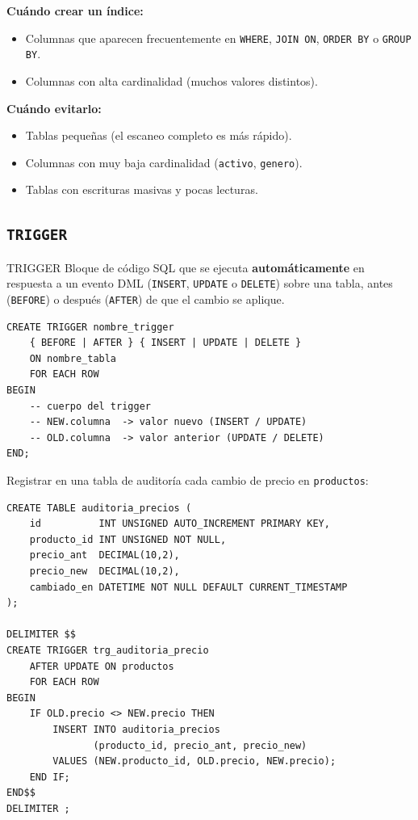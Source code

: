 \begin{nota}
  \textbf{Cuándo crear un índice:}
  \begin{itemize}
    \item Columnas que aparecen frecuentemente en \texttt{WHERE}, \texttt{JOIN ON},
          \texttt{ORDER BY} o \texttt{GROUP BY}.
    \item Columnas con alta cardinalidad (muchos valores distintos).
  \end{itemize}
  \textbf{Cuándo evitarlo:}
  \begin{itemize}
    \item Tablas pequeñas (el escaneo completo es más rápido).
    \item Columnas con muy baja cardinalidad (\texttt{activo}, \texttt{genero}).
    \item Tablas con escrituras masivas y pocas lecturas.
  \end{itemize}
\end{nota}

\subsection{\texttt{TRIGGER}}

\begin{definicion}{TRIGGER}
  Bloque de código SQL que se ejecuta \textbf{automáticamente} en respuesta
  a un evento DML (\texttt{INSERT}, \texttt{UPDATE} o \texttt{DELETE}) sobre
  una tabla, antes (\texttt{BEFORE}) o después (\texttt{AFTER}) de que el
  cambio se aplique.
\end{definicion}

\begin{lstlisting}[style=sql, caption={Sintaxis general de un TRIGGER}]
CREATE TRIGGER nombre_trigger
    { BEFORE | AFTER } { INSERT | UPDATE | DELETE }
    ON nombre_tabla
    FOR EACH ROW
BEGIN
    -- cuerpo del trigger
    -- NEW.columna  -> valor nuevo (INSERT / UPDATE)
    -- OLD.columna  -> valor anterior (UPDATE / DELETE)
END;
\end{lstlisting}

\begin{ejemplo}
  Registrar en una tabla de auditoría cada cambio de precio en
  \texttt{productos}:

\begin{lstlisting}[style=sql, caption={TRIGGER de auditoría de cambios de precio}]
CREATE TABLE auditoria_precios (
    id          INT UNSIGNED AUTO_INCREMENT PRIMARY KEY,
    producto_id INT UNSIGNED NOT NULL,
    precio_ant  DECIMAL(10,2),
    precio_new  DECIMAL(10,2),
    cambiado_en DATETIME NOT NULL DEFAULT CURRENT_TIMESTAMP
);

DELIMITER $$
CREATE TRIGGER trg_auditoria_precio
    AFTER UPDATE ON productos
    FOR EACH ROW
BEGIN
    IF OLD.precio <> NEW.precio THEN
        INSERT INTO auditoria_precios
               (producto_id, precio_ant, precio_new)
        VALUES (NEW.producto_id, OLD.precio, NEW.precio);
    END IF;
END$$
DELIMITER ;
\end{lstlisting}
\end{ejemplo}


